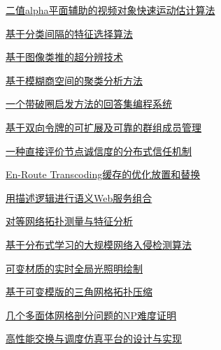 \documentclass[a4paper]{article}
\begin{document}
\href{http://www.jos.org.cn/ch/reader/download_pdf.aspx?file_no=20080404&year_id=2008&quarter_id=4&falg=1}{二值alpha平面辅助的视频对象快速运动估计算法}

\href{http://www.jos.org.cn/ch/reader/download_pdf.aspx?file_no=20080405&year_id=2008&quarter_id=4&falg=1}{基于分类间隔的特征选择算法}

\href{http://www.jos.org.cn/ch/reader/download_pdf.aspx?file_no=20080406&year_id=2008&quarter_id=4&falg=1}{基于图像类推的超分辨技术}

\href{http://www.jos.org.cn/ch/reader/download_pdf.aspx?file_no=20080407&year_id=2008&quarter_id=4&falg=1}{基于模糊商空间的聚类分析方法}

\href{http://www.jos.org.cn/ch/reader/download_pdf.aspx?file_no=20080408&year_id=2008&quarter_id=4&falg=1}{一个带破圈启发方法的回答集编程系统}

\href{http://www.jos.org.cn/ch/reader/download_pdf.aspx?file_no=20080412&year_id=2008&quarter_id=4&falg=1}{基于双向令牌的可扩展及可靠的群组成员管理}

\href{http://www.jos.org.cn/ch/reader/download_pdf.aspx?file_no=20080413&year_id=2008&quarter_id=4&falg=1}{一种直接评价节点诚信度的分布式信任机制}

\href{http://www.jos.org.cn/ch/reader/download_pdf.aspx?file_no=20080414&year_id=2008&quarter_id=4&falg=1}{En-Route Transcoding缓存的优化放置和替换}

\href{http://www.jos.org.cn/ch/reader/download_pdf.aspx?file_no=20080415&year_id=2008&quarter_id=4&falg=1}{用描述逻辑进行语义Web服务组合}

\href{http://www.jos.org.cn/ch/reader/download_pdf.aspx?file_no=20080416&year_id=2008&quarter_id=4&falg=1}{对等网络拓扑测量与特征分析}

\href{http://www.jos.org.cn/ch/reader/download_pdf.aspx?file_no=20080417&year_id=2008&quarter_id=4&falg=1}{基于分布式学习的大规模网络入侵检测算法}

\href{http://www.jos.org.cn/ch/reader/download_pdf.aspx?file_no=20080418&year_id=2008&quarter_id=4&falg=1}{可变材质的实时全局光照明绘制}

\href{http://www.jos.org.cn/ch/reader/download_pdf.aspx?file_no=20080419&year_id=2008&quarter_id=4&falg=1}{基于可变模版的三角网格拓扑压缩}

\href{http://www.jos.org.cn/ch/reader/download_pdf.aspx?file_no=20080420&year_id=2008&quarter_id=4&falg=1}{几个多面体网格剖分问题的NP难度证明}

\href{http://www.jos.org.cn/ch/reader/download_pdf.aspx?file_no=20080421&year_id=2008&quarter_id=4&falg=1}{高性能交换与调度仿真平台的设计与实现}
\end{document}
